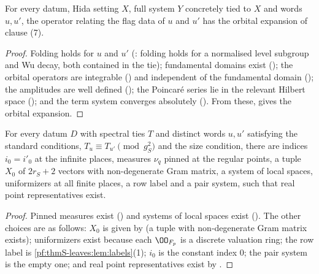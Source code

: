 \begin{proposition}\label{pf:thmS-leaves:prop:kexp}
For every datum, Hida setting $X$, full system $Y$ concretely tied to $X$ and words $u,u'$, the operator relating the flag data of
$u$ and $u'$ has the orbital expansion of clause (7).
\end{proposition}

\begin{proof}
Folding holds for $u$ and $u'$ (: folding holds for a normalised level subgroup
and Wu decay, both contained in the tie); fundamental domains exist (); the
orbital operators are integrable () and independent of the fundamental domain
(); the amplitudes are well defined
(); the Poincar\'e series lie in the relevant Hilbert space
(); and the term system converges absolutely
(). From these,  gives the
orbital expansion.
\end{proof}

\begin{proposition}\label{pf:thmS-leaves:prop:choices}
For every datum $D$ with spectral ties $T$ and distinct words $u,u'$ satisfying the standard conditions,
$T_u\equiv T_{u'}\pmod{g_S^2}$ and the size condition, there are indices $i_0=i'_0$ at the infinite places, measures $\nu_q$ pinned at
the regular points, a tuple $X_0$ of $2r_S+2$ vectors with non-degenerate Gram matrix, a system of local spaces, uniformizers at
all finite places, a row label and a pair system, such that real point representatives exist.
\end{proposition}

\begin{proof}
Pinned measures exist () and systems of local spaces
exist (). The other choices are as follows: $X_0$ is given by  (a tuple with non-degenerate
Gram matrix exists); uniformizers exist because each $\OO_{F_p}$ is a discrete valuation ring; the row label is
\cref{pf:thmS-leaves:lem:labels}(1); $i_0$ is the constant index $0$; the pair system is the empty one; and real point representatives
exist by .
\end{proof}

